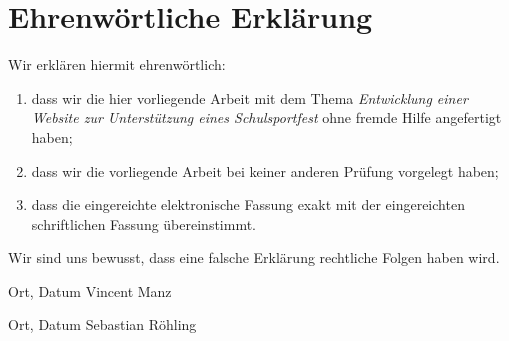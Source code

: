 \clearpage
\chapter*{Ehrenwörtliche Erklärung}	



Wir erklären hiermit ehrenwörtlich: 

\begin{enumerate}
	\item dass wir die hier vorliegende Arbeit mit dem Thema \textit{Entwicklung einer Website zur Unterstützung eines Schulsportfest} ohne fremde Hilfe angefertigt haben; 
	\item dass wir die vorliegende Arbeit bei keiner anderen Prüfung vorgelegt haben; 
	\item dass die eingereichte elektronische Fassung exakt mit der eingereichten schriftlichen Fassung übereinstimmt.
\end{enumerate}
Wir sind uns bewusst, dass eine falsche Erklärung rechtliche Folgen haben wird.

\vspace{3cm}
Ort, Datum \hfill Vincent Manz

\vspace{3cm}
Ort, Datum \hfill Sebastian Röhling 